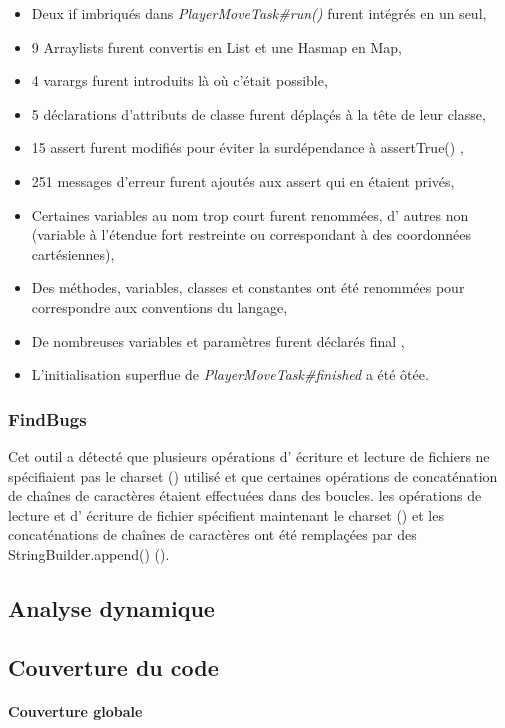 \documentclass[12pt, openany]{report}
\begin{document}
\begin{itemize}
	\item Deux \og if \fg{} imbriqués dans \mbox{\textit{PlayerMoveTask\#run()}} furent intégrés en un seul,
	\item 9 Arraylists furent convertis en List et une Hasmap en Map,
	\item 4 \og varargs \fg{} furent introduits là où c'était possible,
	\item 5 déclarations d'attributs de classe furent déplaçés à la tête de leur classe,
	\item 15 \og assert \fg{} furent modifiés pour éviter la surdépendance à \og assertTrue() \fg{},
	\item 251 messages d'erreur furent ajoutés aux \og assert \fg{} qui en étaient privés,
	\item Certaines variables au nom trop court furent renommées, d' autres non (variable à l'étendue fort restreinte ou correspondant à des coordonnées cartésiennes),
	\item Des méthodes, variables, classes et constantes ont été renommées pour correspondre aux conventions du langage,
	\item De nombreuses variables et paramètres furent déclarés \og final \fg{},
	\item L'initialisation superflue de \mbox{\textit{PlayerMoveTask\#finished}} a été ôtée.
\end{itemize}

\subsubsection*{FindBugs}
Cet outil a détecté que plusieurs opérations d' écriture et lecture de fichiers ne spécifiaient pas le \og charset \fg() utilisé et que certaines opérations de concaténation de chaînes de caractères étaient effectuées dans des boucles.
les opérations de lecture et d' écriture de fichier spécifient maintenant le \og charset \fg() et les concaténations de chaînes de caractères ont été remplaçées par des \og StringBuilder.append() \fg().
\subsection{Analyse dynamique}

\subsection{Couverture du code}
\paragraph{Couverture globale}
\end{document}
